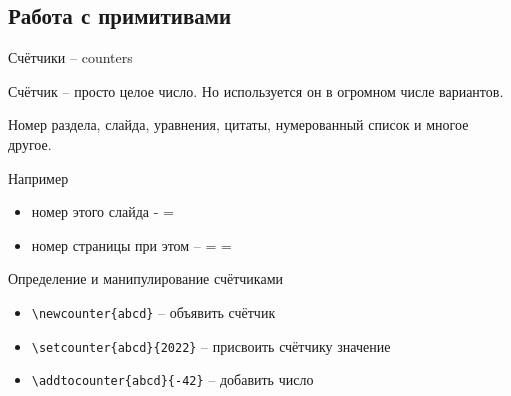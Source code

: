 
\subsection{Работа с примитивами}
\begin{frame}{Счётчики -- counters}\relax

    Счётчик -- просто целое число. Но используется он в огромном числе вариантов.
    
    Номер раздела, слайда, уравнения, цитаты, нумерованный список и многое другое.
     
    Например 
    \begin{itemize}
        \item номер этого слайда - \ccol\insertframenumber = \insertframenumber
        \item номер страницы при этом -- \ccol\the\ccol{} = \ccol\thepage = \thepage
         
    \end{itemize}
\end{frame}

\begin{frame}[fragile]{Определение и манипулирование счётчиками\lW}\relax
    \begin{itemize}
        \item \lstinline|\newcounter{abcd}| -- объявить счётчик 
        \item \lstinline|\setcounter{abcd}{2022}| -- присвоить счётчику значение
        \item \lstinline|\addtocounter{abcd}{-42}| -- добавить число
         
    \end{itemize}
     
\end{frame}
     \newcommand{\countab}[1]{
     \ccol#1\{countname\}&
     \setcounter{tmptt}{1} #1{tmptt} &
     \setcounter{tmptt}{2} #1{tmptt} &
     \setcounter{tmptt}{3} #1{tmptt} &
     \setcounter{tmptt}{4} #1{tmptt} &
     \setcounter{tmptt}{5} #1{tmptt} &
     \setcounter{tmptt}{6} #1{tmptt} &
     \setcounter{tmptt}{7} #1{tmptt} &
     \setcounter{tmptt}{8} #1{tmptt} &
     \setcounter{tmptt}{9} #1{tmptt}
     \\}

